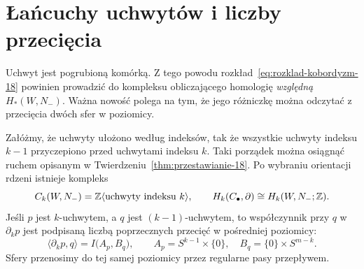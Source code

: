 \section{Łańcuchy uchwytów i liczby przecięcia}
\label{sec:lancuchy-uchwytow-18}

Uchwyt jest pogrubioną komórką. Z tego powodu
rozkład~\eqref{eq:rozklad-kobordyzm-18} powinien
prowadzić do kompleksu obliczającego homologię
\emph{względną} $H_*(W,N_-)$. Ważna nowość
polega na tym, że jego różniczkę można odczytać
z przecięcia dwóch sfer w poziomicy.

\begin{twierdzenie}
\label{thm:kompleks-uchwytow-18}
Załóżmy, że uchwyty ułożono według indeksów,
tak że wszystkie uchwyty indeksu $k-1$
przyczepiono przed uchwytami indeksu $k$.
Taki porządek można osiągnąć ruchem opisanym
w Twierdzeniu~\ref{thm:przestawianie-18}.
Po wybraniu orientacji rdzeni istnieje kompleks
\[
 C_k(W,N_-)=\mathbb{Z}\langle
       \text{uchwyty indeksu }k\rangle,
 \qquad H_k(C_\bullet,\partial)\cong H_k(W,N_-;\mathbb{Z}).
\]
Jeśli $p$ jest $k$-uchwytem, a $q$ jest
$(k-1)$-uchwytem, to współczynnik przy $q$
w $\partial_k p$ jest podpisaną liczbą
poprzecznych przecięć w pośredniej poziomicy:
\begin{equation}\label{eq:macierz-uchwyty-18}
 \langle\partial_kp,q\rangle
 = I\bigl(A_p,B_q\bigr),\qquad
 A_p=S^{k-1}\times\{0\},\quad
 B_q=\{0\}\times S^{m-k}.
\end{equation}
Sfery przenosimy do tej samej poziomicy
przez regularne pasy przepływem.
\end{twierdzenie}
